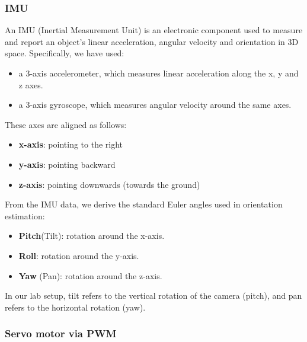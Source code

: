 \subsubsection{IMU}


An IMU (Inertial Measurement Unit) is an electronic component used to measure and report an object's linear acceleration, angular velocity and orientation in 3D space. Specifically, we have used: 

\begin{itemize}
    \item a 3-axis accelerometer, which measures linear acceleration along the x, y and z axes.
    \item a 3-axis gyroscope, which measures angular velocity around the same axes.
\end{itemize}

\noindent
These axes are aligned as follows: 

\begin{itemize}
    \item \textbf{x-axis}: pointing to the right
    \item \textbf{y-axis}: pointing backward
    \item \textbf{z-axis}: pointing downwards (towards the ground)
\end{itemize}


\noindent
From the IMU data, we derive the standard Euler angles used in orientation estimation: 

\begin{itemize}
    \item \textbf{Pitch}(Tilt): rotation around the x-axis.
    \item \textbf{Roll}: rotation around the y-axis.
    \item \textbf{Yaw} (Pan): rotation around the z-axis.
\end{itemize}

In our lab setup, tilt refers to the vertical rotation of the camera (pitch), and pan refers to the horizontal rotation (yaw). 

\subsubsection{Servo motor via PWM}

